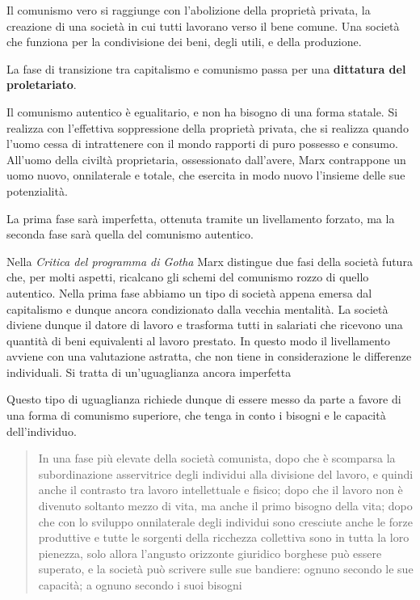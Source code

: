 \documentclass[a4paper, twoside, titlepage]{book}
\newcommand{\citazione}[1]{%
  \begin{quotation}
  #1
  \end{quotation}}
\begin{document}
Il comunismo vero si raggiunge con l’abolizione della proprietà privata, la creazione di una società in cui tutti lavorano verso il bene comune. Una società che funziona per la condivisione dei beni, degli utili, e della produzione.

La fase di transizione tra capitalismo e comunismo passa per una \textbf{dittatura del proletariato}.

Il comunismo autentico è egualitario, e non ha bisogno di una forma statale.
Si realizza con l’effettiva soppressione della proprietà privata, che si realizza quando l’uomo cessa di intrattenere con il mondo rapporti di puro possesso e consumo. All'uomo della civiltà proprietaria, ossessionato dall'avere, Marx contrappone un uomo nuovo, onnilaterale e totale, che esercita in modo nuovo l'insieme delle sue potenzialità.

La prima fase sarà imperfetta, ottenuta tramite un livellamento forzato, ma la seconda fase sarà quella del comunismo autentico.

Nella \textit{Critica del programma di Gotha} Marx distingue due fasi della società futura che, per molti aspetti, ricalcano gli schemi del comunismo rozzo di quello autentico. Nella prima fase abbiamo un tipo di società appena emersa dal capitalismo e dunque ancora condizionato dalla vecchia mentalità. La società diviene dunque il datore di lavoro e trasforma tutti in salariati che ricevono una quantità di beni equivalenti al lavoro prestato. In questo modo il livellamento avviene con una valutazione astratta, che non tiene in considerazione le differenze individuali. Si tratta di un'uguaglianza ancora imperfetta

Questo tipo di uguaglianza richiede dunque di essere messo da parte a favore di una forma di comunismo superiore, che tenga in conto i bisogni e le capacità dell'individuo.

\citazione{In una fase più elevate della società comunista, dopo che è scomparsa la subordinazione asservitrice degli individui alla divisione del lavoro, e quindi anche il contrasto tra lavoro intellettuale e fisico; dopo che il lavoro non è divenuto soltanto mezzo di vita, ma anche il primo bisogno della vita; dopo che con lo sviluppo onnilaterale degli individui sono cresciute anche le forze produttive e tutte le sorgenti della ricchezza collettiva sono in tutta la loro pienezza, solo allora l'angusto orizzonte giuridico borghese può essere superato, e la società può scrivere sulle sue bandiere: ognuno secondo le sue capacità; a ognuno secondo i suoi bisogni}
\end{document}
